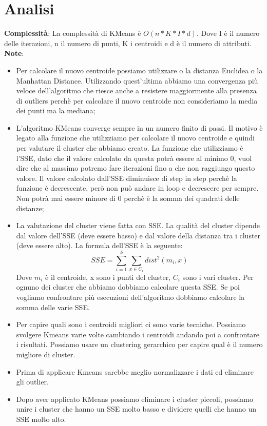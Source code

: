 \documentclass[14pt]{extreport}
\begin{document}
\section{Analisi}

{\bf Complessità}:
\newline
\newline
La complessità di KMeans è $O(n*K*I*d)$. Dove I è il numero delle iterazioni, n il numero di punti, K i centroidi e d è il numero di attributi.
\newline
\newline
{\bf Note}:

\begin{itemize}
    \item Per calcolare il nuovo centroide possiamo utilizzare o la distanza Euclidea o la Manhattan Distance. Utilizzando quest'ultima abbiamo una convergenza più veloce dell'algoritmo che riesce anche a resistere maggiormente alla presenza di outliers perchè per calcolare il nuovo centroide non consideriamo la media dei punti ma la mediana;
    \item L'algoritmo KMeans converge sempre in un numero finito di passi. Il motivo è legato alla funzione che utilizziamo per calcolare il nuovo centroide e quindi per valutare il cluster che abbiamo creato.
    La funzione che utilizziamo è l'SSE, dato che il valore calcolato da questa potrà essere al minimo 0, vuol dire che al massimo potremo fare iterazioni fino a che non raggiungo questo valore.
    Il valore calcolato dall'SSE diminuisce di step in step perchè la funzione è decrescente, però non può andare in loop e decrescere per sempre.
    Non potrà mai essere minore di 0 perchè è la somma dei quadrati delle distanze;
    \item La valutazione del cluster viene fatta con SSE. La qualità del cluster dipende dal valore dell'SSE (deve essere basso) e dal valore della distanza tra i cluster (deve essere alto).
    La formula dell'SSE è la seguente:
    \begin{equation}
        SSE = \sum\limits_{i=1}^{k}  \sum\limits_{x \in C_i} dist^2 (m_i, x) 
\end{equation}
    Dove $m_i$ è il centroide, x sono i punti del cluster, $C_i$ sono i vari cluster.
    Per ognuno dei cluster che abbiamo dobbiamo calcolare questa SSE. Se poi vogliamo confrontare più esecuzioni dell'algoritmo dobbiamo calcolare la somma delle varie SSE.
    \item Per capire quali sono i centroidi migliori ci sono varie tecniche. Possiamo svolgere Kmeans varie volte cambiando i centroidi andando poi a confrontare i risultati. Possiamo usare un clustering gerarchico per capire qual è il numero migliore di cluster.
    \item Prima di applicare Kmeans sarebbe meglio normalizzare i dati ed eliminare gli outlier.
    \item Dopo aver applicato KMeans possiamo eliminare i cluster piccoli, possiamo unire i cluster che hanno un SSE molto basso e dividere quelli che hanno un SSE molto alto.
\end{itemize}
\end{document}
